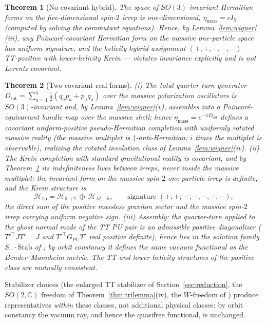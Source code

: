 \documentclass[11pt]{article}
\newtheorem{theorem}{Theorem}[section]
\theoremstyle{definition}
\theoremstyle{remark}
\newcommand{\C}{\mathbb{C}}
\newcommand{\dd}{\ddagger}
\begin{document}
\begin{theorem}[No covariant hybrid]\label{thm:nohybrid}
The space of $SO(3)$-invariant Hermitian forms on the five-dimensional
spin-$2$ irrep is one-dimensional, $\eta_{\mathrm{mass}}=cI_5$ (computed
by solving the commutant equations).  Hence, by
Lemma~\ref{lem:wigner}(iii), any Poincar\'e-covariant Hermitian form on
the massive one-particle space has uniform signature, and the
helicity-hybrid assignment $(+,+,-,-,-)$ --- TT-positive with
lower-helicity Krein --- violates invariance explicitly and is not
Lorentz covariant.
\end{theorem}

\begin{theorem}[Two covariant real forms]\label{thm:tworeal}
(i) The total quarter-turn generator
$D_{\mathrm{tot}}=\sum_{a=1}^{5}\tfrac12(q_ap_a+p_aq_a)$ over the massive
polarization oscillators is $SO(3)$-invariant and, by
Lemma~\ref{lem:wigner}(v), assembles into a Poincar\'e-equivariant bundle
map over the massive shell; hence
$\eta_{\mathrm{mass}}=e^{-\pi D_{\mathrm{tot}}}$ defines a covariant
uniform-positive pseudo-Hermitian completion with uniformly rotated
massive reality (the massive multiplet is $\dd$-anti-Hermitian; $i$ times
the multiplet is observable), realizing the rotated involution class of
Lemma~\ref{lem:wigner}(iv).  (ii) The Krein completion with standard
gravitational reality is covariant, and by Theorem~\ref{thm:nohybrid} its
indefiniteness lives \emph{between} irreps, never inside the massive
multiplet: the invariant form on the massive spin-$2$ one-particle irrep
is definite, and the Krein structure is
\begin{equation}
\mathcal H_{\mathrm{1p}}
=\mathcal H_{0,+2}\ \oplus\ \mathcal H_{M,-5},
\qquad\text{signature } (+,+;\,-,-,-,-,-),
\end{equation}
the direct sum of the positive massless graviton sector and the massive
spin-$2$ irrep carrying uniform negative sign.  (iii) Assembly: the
quarter-turn applied to the ghost normal
mode of the TT PU pair is an admissible positive diagonalizer
($T'^{\top}JT'=J$ and $T'^{\top}G_{\mathrm{PU}}T'$ real positive
definite), hence lies in the solution family $S_+\cdot\mathrm{Stab}$ of
\cite{companion1}; by orbit constancy \cite{companion3} it defines the
same vacuum functional as the Bender--Mannheim metric.  The TT and
lower-helicity structures of the positive class are mutually consistent.
\end{theorem}

Stabilizer choices (the enlarged TT stabilizer of
Section~\ref{sec:reduction}, the $SO(2,\C)$ freedom of
Theorem~\ref{thm:trilemma}(iv), the $W$-freedom of \cite{companion1})
produce representatives \emph{within} these classes, not additional
physical classes: by orbit constancy the vacuum ray, and hence the
quasifree functional, is unchanged.
\end{document}
